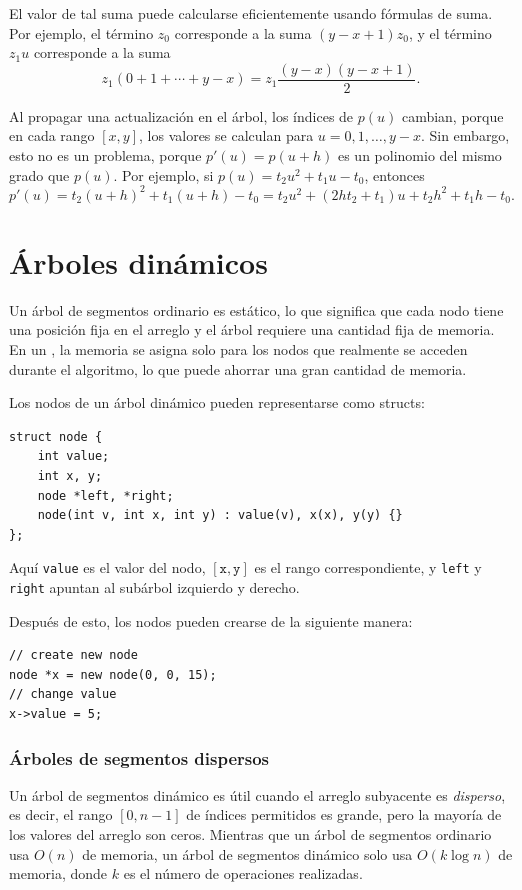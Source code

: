 El valor de tal suma
puede calcularse eficientemente usando fórmulas de suma.
Por ejemplo, el término $z_0$ corresponde a la suma
$(y-x+1)z_0$, y el término $z_1 u$ corresponde a la suma
\[z_1(0+1+\cdots+y-x) = z_1 \frac{(y-x)(y-x+1)}{2} .\]

Al propagar una actualización en el árbol,
los índices de $p(u)$ cambian,
porque en cada rango $[x,y]$,
los valores se
calculan para $u=0,1,\ldots,y-x$.
Sin embargo, esto no es un problema, porque
$p'(u)=p(u+h)$ es un polinomio
del mismo grado que $p(u)$.
Por ejemplo, si $p(u)=t_2 u^2+t_1 u-t_0$, entonces
\[p'(u)=t_2(u+h)^2+t_1(u+h)-t_0=t_2 u^2 + (2ht_2+t_1)u+t_2h^2+t_1h-t_0.\]

\section{Árboles dinámicos}


Un árbol de segmentos ordinario es estático,
lo que significa que cada nodo tiene una posición fija
en el arreglo y el árbol requiere
una cantidad fija de memoria.
En un ,
la memoria se asigna solo para los nodos que
realmente se acceden durante el algoritmo,
lo que puede ahorrar una gran cantidad de memoria.

Los nodos de un árbol dinámico pueden representarse como structs:
\begin{lstlisting}
struct node {
    int value;
    int x, y;
    node *left, *right;
    node(int v, int x, int y) : value(v), x(x), y(y) {}
};
\end{lstlisting}
Aquí \texttt{value} es el valor del nodo,
$[\texttt{x},\texttt{y}]$ es el rango correspondiente,
y \texttt{left} y \texttt{right} apuntan al subárbol izquierdo
y derecho.

Después de esto, los nodos pueden crearse de la siguiente manera:
\begin{lstlisting}
// create new node
node *x = new node(0, 0, 15);
// change value
x->value = 5;
\end{lstlisting}

\subsubsection{Árboles de segmentos dispersos}


Un árbol de segmentos dinámico es útil cuando
el arreglo subyacente es \emph{disperso},
es decir, el rango $[0,n-1]$
de índices permitidos es grande,
pero la mayoría de los valores del arreglo son ceros.
Mientras que un árbol de segmentos ordinario usa $O(n)$ de memoria,
un árbol de segmentos dinámico solo usa $O(k \log n)$ de memoria,
donde $k$ es el número de operaciones realizadas.

